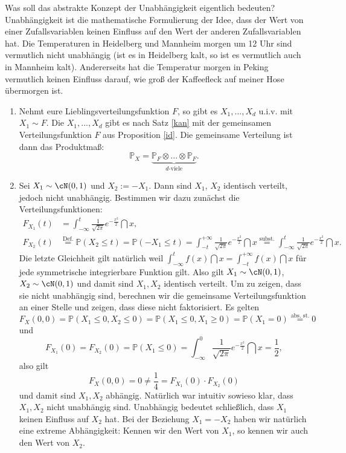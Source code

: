 \begin{bem1}
	Was soll das abstrakte Konzept der Unabh\"angigkeit eigentlich bedeuten? Unabh\"angigkeit ist die mathematische Formulierung der Idee, dass der Wert von einer Zufallsvariablen keinen Einfluss auf den Wert der anderen Zufallsvariablen hat. Die Temperaturen in Heidelberg und Mannheim morgen um 12 Uhr sind vermutlich nicht unabh\"angig (ist es in Heidelberg kalt, so ist es vermutlich auch in Mannheim kalt). Andererseits hat die Temperatur morgen in Peking vermutlich keinen Einfluss darauf, wie gro\ss{} der Kaffeefleck auf meiner Hose \"ubermorgen ist.
\end{bem1}


\marginpar{\textcolor{red}{Vorlesung 21}}

\begin{beispiel}\abs
	\begin{enumerate}[label=(\roman*)]
		\item Nehmt eure Lieblingsverteilungsfunktion $F$, so gibt es $X_1,...,X_d$ u.i.v. mit $X_1 \sim F$. Die $X_1,...,X_d$ gibt es nach Satz \ref{kan} mit der gemeinsamen Verteilungsfunktion $F$ aus Proposition \ref{id}. Die gemeinsame Verteilung ist dann das Produktma\ss{}:
		 \[ \mathbb{P}_X = \underbrace{\mathbb{P}_F \otimes ... \otimes \mathbb{P}_F}_{d\text{-viele}}. \]
		\item Sei $X_1 \sim \cN(0,1)$ und $X_2 := -X_1$. Dann sind $X_1$, $X_2$ identisch verteilt, jedoch nicht unabh\"angig. Bestimmen wir dazu zun\"achst die Verteilungsfunktionen:
		\begin{align*}
			F_{X_1}(t) &= \int_{-\infty}^{t} \frac{1}{\sqrt{2 \pi}} e^{-\frac{x^2}{2}} \dint x,\\
			F_{X_2}(t)& \overset{\text{Def.}}{=} \mathbb{P}(X_2 \leq t) = \mathbb{P}(-X_1 \leq t) = \int_{-t}^{+\infty} \frac{1}{\sqrt{2 \pi}} e^{-\frac{x^2}{2}} \dint x 
			 \overset{\text{subst.}}{=} \int_{-\infty}^{t} \frac{1}{\sqrt{2 \pi}} e^{-\frac{x^2}{2}} \dint x.
		\end{align*}
		Die letzte Gleichheit gilt nat\"urlich weil $\int_{-\infty}^t f(x)\dint x=\int_{-t}^{+\infty} f(x)\dint x$ f\"ur jede symmetrische integrierbare Funktion gilt.
		Also gilt $X_1 \sim \cN(0,1)$, $X_2 \sim \cN(0,1)$ und damit sind $X_1, X_2$ identisch verteilt. Um zu zeigen, dass sie nicht unabh\"angig sind, berechnen wir die gemeinsame Verteilungsfunktion an einer Stelle und zeigen, dass diese nicht faktorisiert. Es gelten
		\[ F_X(0,0) = \mathbb{P}(X_1 \leq 0, X_2 \leq 0) = \mathbb{P}(X_1 \leq 0, X_1 \geq 0) = \mathbb{P}(X_1 = 0) \overset{\text{abs. st.}}{=} 0 \] und
		\[ F_{X_1}(0) = F_{X_2}(0) = \mathbb{P}(X_1 \leq 0) = \int_{-\infty}^{0} \frac{1}{\sqrt{2 \pi}} e^{-\frac{x^2}{2}} \dint x = \frac{1}{2}, \]
		also gilt $$ F_X(0,0) = 0 \neq \frac{1}{4} = F_{X_1}(0) \cdot F_{X_2}(0)$$ und damit sind $X_1,X_2$ abhängig. Nat\"urlich war intuitiv sowieso klar, dass $X_1, X_2$ nicht unabh\"angig sind. Unabh\"angig bedeutet schlie\ss lich, dass $X_1$ keinen Einfluss auf $X_2$ hat. Bei der Beziehung $X_1=-X_2$ haben wir nat\"urlich eine extreme Abh\"angigkeit: Kennen wir den Wert von $X_1$, so kennen wir auch den Wert von $X_2$.		
	\end{enumerate}
\end{beispiel}


